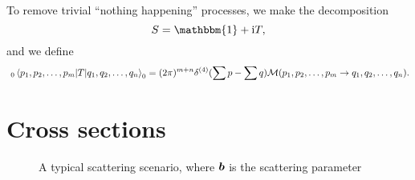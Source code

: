 \documentclass[hyperref, a4paper]{article}
\newcommand*{\ii}{\mathrm{i}}
\begin{document}
To remove trivial ``nothing happening'' processes, we make the decomposition 
\begin{equation}
    S = \mathbbm{1} + \ii T ,
\end{equation}
and we define 
\begin{equation}
    \ _0\mel{p_1, p_2, \ldots, p_m}{T}{q_1, q_2, \ldots, q_n}_0 = (2\pi)^{m+n} \delta^{(4)}(\sum p - \sum q) \mathcal{M}(p_1, p_2, \ldots, p_m \to q_1, q_2, \ldots, q_n).
\end{equation}

\section{Cross sections}

\begin{figure}
    \centering
    
    \caption{A typical scattering scenario, where $\vb*{b}$ is the scattering parameter}
    \label{fig:scattering-params}
\end{figure}
\end{document}
